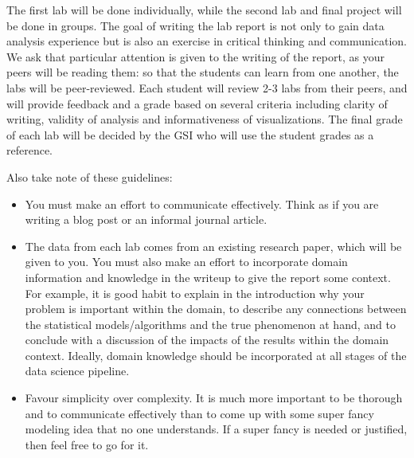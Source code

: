 \documentclass[letterpaper,12pt]{article}
\begin{document}
The first lab will be done individually, while the second lab and final project will be done in groups. The goal of writing the lab report is not only to gain data analysis
experience but is also an exercise in critical thinking and communication. We ask that particular attention is given to
the writing of the report, as your peers will be reading them: so that the students can learn from
one another, the labs will be peer-reviewed. Each student will review 2-3 labs from their peers, and
will provide feedback and a grade based on several criteria including clarity of writing, validity of
analysis and informativeness of visualizations. The final grade of each lab will be decided by the
GSI who will use the student grades as a reference.

Also take note of these guidelines:
\begin{itemize}
    \item You must make an effort to communicate effectively. Think as if you are writing a blog post or an informal journal article.
    \item The data from each lab comes from an existing research paper, which will be given to you. You must also make an effort to incorporate domain information and knowledge in the writeup to give the report some context. For example, it is good habit to explain in the introduction why your problem is important within the domain, to describe any connections between the statistical models/algorithms and the true phenomenon at hand, and to conclude with a discussion of the impacts of the results within the domain context. Ideally, domain knowledge should be incorporated at all stages of the data science pipeline.
    \item Favour simplicity over complexity. It is much more important to be thorough and to communicate effectively than to come up with some super fancy modeling idea that no one understands. If a super fancy is needed or justified, then feel free to go for it.
\end{itemize}
\end{document}
